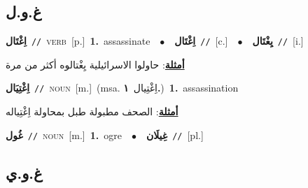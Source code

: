 \documentclass[10pt,a4paper,twoside]{article} %
\begin{document}
\begin{multicols}{2}
\vspace{-3mm}
\subsection*{\color{blue}\foreignlanguage{arabic}{غ.و.ل}\color{blue}{}} 

{\setlength\topsep{0pt}\textbf{\foreignlanguage{arabic}{اِغْتَال}}\ {\color{gray}\texttt{//}\color{black}}\ \textsc{verb}\ [p.]\ \textbf{1.}~assassinate\ \ $\bullet$\ \ \setlength\topsep{0pt}\textbf{\foreignlanguage{arabic}{اِغْتَال}}\ {\color{gray}\texttt{//}\color{black}}\ [c.]\ \ $\bullet$\ \ \setlength\topsep{0pt}\textbf{\foreignlanguage{arabic}{يِغْتَال}}\ {\color{gray}\texttt{//}\color{black}}\ [i.]\  \begin{flushright}\color{gray}\foreignlanguage{arabic}{\textbf{\underline{\foreignlanguage{arabic}{أمثلة}}}: حاولوا الاسرائيلية يِغْتالوه أكثر من مرة}\end{flushright}\color{black}} \vspace{2mm}

{\setlength\topsep{0pt}\textbf{\foreignlanguage{arabic}{اِغْتِيَال}}\ {\color{gray}\texttt{//}\color{black}}\ \textsc{noun}\ [m.]\ \color{gray}(msa. \foreignlanguage{arabic}{اِغْتِيال}~\foreignlanguage{arabic}{\textbf{١.}})\color{black}\ \textbf{1.}~assassination\  \begin{flushright}\color{gray}\foreignlanguage{arabic}{\textbf{\underline{\foreignlanguage{arabic}{أمثلة}}}: الصحف مطبولة طبل بمحاولة اِغْتِياله}\end{flushright}\color{black}} \vspace{2mm}

{\setlength\topsep{0pt}\textbf{\foreignlanguage{arabic}{غُول}}\ {\color{gray}\texttt{//}\color{black}}\ \textsc{noun}\ [m.]\ \textbf{1.}~ogre\ \ $\bullet$\ \ \setlength\topsep{0pt}\textbf{\foreignlanguage{arabic}{غِيلَان}}\ {\color{gray}\texttt{//}\color{black}}\ [pl.]\ } \vspace{2mm}

\vspace{-3mm}
\subsection*{\color{blue}\foreignlanguage{arabic}{غ.و.ي}\color{blue}{}} 


\end{multicols}
\end{document}
